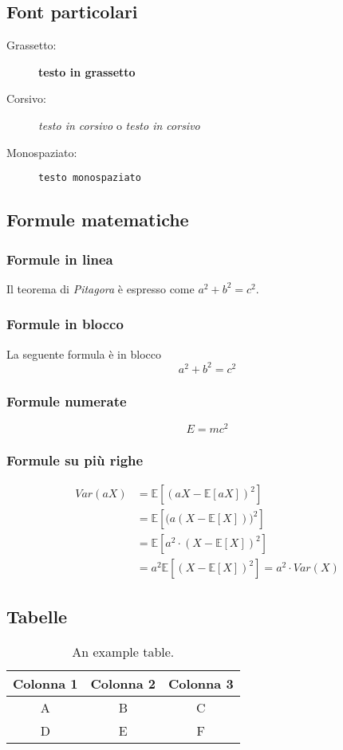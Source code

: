 \subsection*{Font particolari}
\begin{description}
    \item[Grassetto:] \textbf{testo in grassetto}
    \item[Corsivo:] \emph{testo in corsivo} o \textit{testo in corsivo}
    \item[Monospaziato:] \texttt{testo monospaziato}
\end{description}

\subsection*{Formule matematiche}

\subsubsection*{Formule in linea}
Il teorema di \emph{Pitagora} è espresso come $a^2 + b^2 = c^2$.

\subsubsection*{Formule in blocco}
La seguente formula è in blocco
\[
a^2 + b^2 = c^2
\]

\subsubsection*{Formule numerate}
\begin{equation}\label{eq:energy}
E = mc^2
\end{equation}

\subsubsection*{Formule su più righe}
\begin{align*}
    Var(aX) &= \mathbb{E}[(aX - \mathbb{E}[aX])^2]\\
    &= \mathbb{E}[\big(a(X - \mathbb{E}[X])\big)^2]\\
    &= \mathbb{E}[a^2 \cdot (X - \mathbb{E}[X])^2]\\
    &= a^2\mathbb{E}[(X - \mathbb{E}[X])^2] = a^2 \cdot Var(X)
\end{align*}

\subsection*{Tabelle}
\begin{table}[H]
\centering
\begin{tabular}{|c||c|c|}
\hline
Colonna 1 & Colonna 2 & Colonna 3 \\ \hline\hline
A         & B         & C         \\ \hline
D         & E         & F         \\ \hline
\end{tabular}
\caption{An example table.}
\label{tab:table_example}
\end{table}


